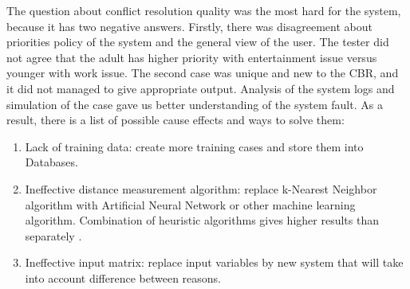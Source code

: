\documentclass{llncs}
\begin{document}
    The question about conflict resolution quality was the most hard for the system, because it has two negative answers.
    Firstly, there was disagreement about priorities policy of the system and the general view of the user.
    The tester did not agree that the adult has higher priority with entertainment issue versus younger with work issue.
    The second case was unique and new to the CBR, and it did not managed to give appropriate output.
    Analysis of the system logs and simulation of the case gave us better understanding of the system fault.
    As a result, there is a list of possible cause effects and ways to solve them:\\
    \begin{enumerate}
        \item Lack of training data: create more training cases and store them into Databases.
        \item Ineffective distance measurement algorithm: replace k-Nearest Neighbor algorithm with Artificial Neural Network or other machine learning algorithm. Combination of heuristic algorithms gives higher results than separately \cite{12}.
        \item Ineffective input matrix: replace input variables by new system that will take into account difference between reasons.
    \end{enumerate}
\end{document}
